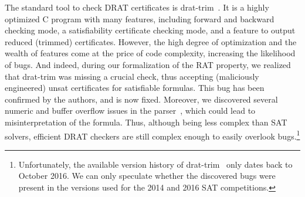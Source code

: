 \documentclass[smallcondensed]{svjour3}     %
\begin{document}

The standard tool to check DRAT certificates is drat-trim~\cite{WHH14,drat-trim-webpage}. 
It is a highly optimized C program with many features, including forward and backward checking mode, a satisfiability certificate checking mode,
and a feature to output reduced (trimmed) certificates.
% 
% 
However, the high degree of optimization and the wealth of features come at the price of code complexity, increasing the likelihood of bugs. And indeed, 
during our formalization of the RAT property, we realized that drat-trim was missing a crucial check, thus accepting (maliciously engineered) unsat certificates 
for satisfiable formulas. This bug has been confirmed by the authors, and is now fixed.
Moreover, we discovered several numeric and buffer overflow issues in the parser~\cite{drat-trim-issues}, which could lead to misinterpretation of the formula.
Thus, although being less complex than SAT solvers, efficient DRAT checkers are still complex enough to easily overlook bugs.\footnote{Unfortunately, the available version history of drat-trim~\cite{drat-trim-github} only dates back to October 2016. We can only speculate whether the discovered bugs were present in the versions used for the 2014 and 2016 SAT competitions.} 
\end{document}
